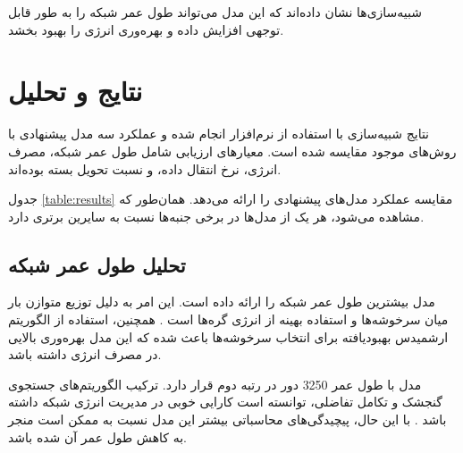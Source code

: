 \documentclass[12pt, onecolumn, a4paper]{article}
\begin{document}
شبیه‌سازی‌ها نشان داده‌اند که این مدل می‌تواند طول عمر شبکه را به طور قابل توجهی افزایش داده و بهره‌وری انرژی را بهبود بخشد.

\section{نتایج و تحلیل}

نتایج شبیه‌سازی با استفاده از نرم‌افزار  انجام شده و عملکرد سه مدل پیشنهادی با روش‌های موجود مقایسه شده است. معیارهای ارزیابی شامل طول عمر شبکه، مصرف انرژی، نرخ انتقال داده، و نسبت تحویل بسته بوده‌اند. 

جدول \ref{table:results} مقایسه عملکرد مدل‌های پیشنهادی را ارائه می‌دهد. همان‌طور که مشاهده می‌شود، هر یک از مدل‌ها در برخی جنبه‌ها نسبت به سایرین برتری دارد. 

\begin{table}[h!]
	\centering
	\caption{مقایسه عملکرد مدل‌های پیشنهادی}
	\label{table:results}
\end{table}

\subsection*{تحلیل طول عمر شبکه}
مدل  بیشترین طول عمر شبکه را ارائه داده است. این امر به دلیل توزیع متوازن بار میان سرخوشه‌ها و استفاده بهینه از انرژی گره‌ها است \cite{ref7, ref8}. همچنین، استفاده از الگوریتم ارشمیدس بهبودیافته برای انتخاب سرخوشه‌ها باعث شده که این مدل بهره‌وری بالایی در مصرف انرژی داشته باشد. 

مدل  با طول عمر 3250 دور در رتبه دوم قرار دارد. ترکیب الگوریتم‌های جستجوی گنجشک و تکامل تفاضلی، توانسته است کارایی خوبی در مدیریت انرژی شبکه داشته باشد \cite{ref9}. با این حال، پیچیدگی‌های محاسباتی بیشتر این مدل نسبت به  ممکن است منجر به کاهش طول عمر آن شده باشد.
\end{document}
